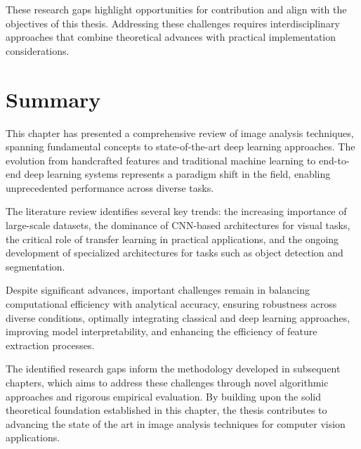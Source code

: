 These research gaps highlight opportunities for contribution and align with the objectives of this thesis. Addressing these challenges requires interdisciplinary approaches that combine theoretical advances with practical implementation considerations.

\section{Summary}
This chapter has presented a comprehensive review of image analysis techniques, spanning fundamental concepts to state-of-the-art deep learning approaches. The evolution from handcrafted features and traditional machine learning to end-to-end deep learning systems represents a paradigm shift in the field, enabling unprecedented performance across diverse tasks.

The literature review identifies several key trends: the increasing importance of large-scale datasets, the dominance of CNN-based architectures for visual tasks, the critical role of transfer learning in practical applications, and the ongoing development of specialized architectures for tasks such as object detection and segmentation.

Despite significant advances, important challenges remain in balancing computational efficiency with analytical accuracy, ensuring robustness across diverse conditions, optimally integrating classical and deep learning approaches, improving model interpretability, and enhancing the efficiency of feature extraction processes.

The identified research gaps inform the methodology developed in subsequent chapters, which aims to address these challenges through novel algorithmic approaches and rigorous empirical evaluation. By building upon the solid theoretical foundation established in this chapter, the thesis contributes to advancing the state of the art in image analysis techniques for computer vision applications.